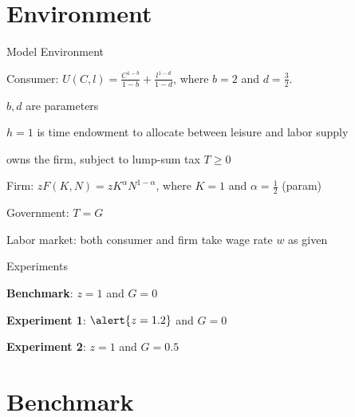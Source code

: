 \documentclass[11pt,aspectratio=169,usenames,dvipsnames]{beamer}
\let\tempone\itemize
\let\temptwo\enditemize
\renewenvironment{itemize}{\tempone\addtolength{\itemsep}{\fill}}{\temptwo}
\let\tempa\enumerate
\let\tempb\endenumerate
\renewenvironment{enumerate}{\tempa\addtolength{\itemsep}{\fill}}{\tempb}
\begin{document}
\section{Environment}
\label{sec:Environment}

\begin{frame}{Model Environment}
\label{slide:Model_Environment}
    \begin{itemize}
        \item Consumer: $ U( C, l ) = \frac{C^{1-b}}{1-b} + \frac{l^{1-d}}{1-d} $, where $ b=2 $ and $ d = \frac{3}{2} $.
        \begin{itemize}
            \item $ b, d $ are \alert{parameters}
            \item $ h = 1 $ is time endowment to allocate between leisure and labor supply
            \item owns the firm, subject to lump-sum tax $ T \ge  0 $
        \end{itemize}
        \item Firm: $ z F( K, N ) = z K^{\alpha} N^{1-\alpha} $, where $ K = 1 $ and $ \alpha = \frac{1}{2} $ (param)
        \item Government: $ T = G $
        \item Labor market: both consumer and firm take wage rate $ w $ as given
    \end{itemize}
\end{frame}

\begin{frame}{Experiments}
\label{slide:Experiments}
    \begin{enumerate}
        \item \textbf{Benchmark}: $ z = 1 $ and $ G = 0 $
        \item \textbf{Experiment 1}: $ \alert{z = 1.2} $ and $ G = 0 $
        \item \textbf{Experiment 2}: $ z = 1 $ and $ G = 0.5 $
    \end{enumerate}
\end{frame}

\section{Benchmark}
\label{sec:Benchmark}
\end{document}
